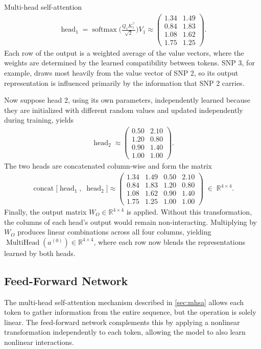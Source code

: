 \begin{exmp}{Multi-head self-attention}
\begin{align*}
    \operatorname{head}_1
    = \operatorname{softmax}\!\biggl(\frac{Q_1 K_1^\top}{\sqrt{2}}\biggr) V_1
    \approx \begin{pmatrix} 1.34 & 1.49 \\ 0.84 & 1.83 \\ 1.08 & 1.62 \\ 1.75 & 1.25 \end{pmatrix}.
\end{align*}
Each row of the output is a weighted average of the value vectors, where the weights are determined by the learned compatibility between tokens. SNP 3, for example, draws most heavily from the value vector of SNP 2, so its output representation is influenced primarily by the information that SNP 2 carries.

Now suppose head 2, using its own parameters, independently learned because they are initialized with different random values and updated independently during training, yields
\begin{align*}
    \operatorname{head}_2
    \approx \begin{pmatrix} 0.50 & 2.10 \\ 1.20 & 0.80 \\ 0.90 & 1.40 \\ 1.00 & 1.00 \end{pmatrix}.
\end{align*}
The two heads are concatenated column-wise and form the matrix
\begin{align*}
    \operatorname{concat}\!\bigl[\operatorname{head}_1,\; \operatorname{head}_2\bigr]
    \approx \begin{pmatrix} 1.34 & 1.49 & 0.50 & 2.10 \\ 0.84 & 1.83 & 1.20 & 0.80 \\ 1.08 & 1.62 & 0.90 & 1.40 \\ 1.75 & 1.25 & 1.00 & 1.00 \end{pmatrix}
    \;\in\; \mathbb{R}^{4 \times 4}.
\end{align*}
Finally, the output matrix $W_O \in \mathbb{R}^{4 \times 4}$ is applied. Without this transformation, the columns of each head's output would remain non-interacting. Multiplying by $W_O$ produces linear combinations across all four columns, yielding $\operatorname{MultiHead}(a^{(0)}) \in \mathbb{R}^{4 \times 4}$, where each row now blends the representations learned by both heads.
\end{exmp}

\subsection{Feed-Forward Network}
\label{sec:ffn}
The multi-head self-attention mechanism described in \autoref{sec:mhsa} allows each token to gather information from the entire sequence, but the operation is solely linear. The feed-forward network complements this by applying a nonlinear transformation independently to each token, allowing the model to also learn nonlinear interactions.

